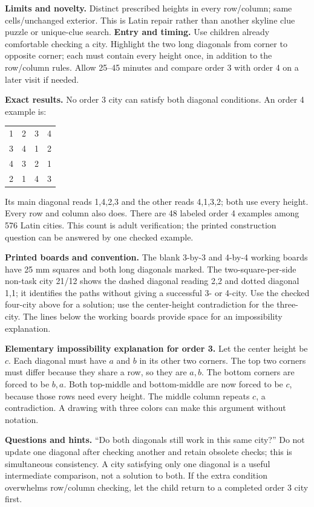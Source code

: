 \textbf{Limits and novelty.} Distinct prescribed heights in every row/column; same cells/unchanged exterior. This is Latin repair rather than another skyline clue puzzle or unique-clue search.
\newpage
{}
\textbf{Entry and timing.} Use children already comfortable checking a city. Highlight the two long diagonals from corner to opposite corner; each must contain every height once, in addition to the row/column rules. Allow 25--45 minutes and compare order 3 with order 4 on a later visit if needed.

\textbf{Exact results.} No order 3 city can satisfy both diagonal conditions. An order 4 example is:

\begin{center}\begin{tabular}{cccc}
1&2&3&4\\3&4&1&2\\4&3&2&1\\2&1&4&3
\end{tabular}\end{center}

Its main diagonal reads 1,4,2,3 and the other reads 4,1,3,2; both use every height. Every row and column also does. There are 48 labeled order 4 examples among 576 Latin cities. This count is adult verification; the printed construction question can be answered by one checked example.

\textbf{Printed boards and convention.} The blank 3-by-3 and 4-by-4 working boards have 25 mm squares and both long diagonals marked. The two-square-per-side non-task city 21/12 shows the dashed diagonal reading 2,2 and dotted diagonal 1,1; it identifies the paths without giving a successful 3- or 4-city. Use the checked four-city above for a solution; use the center-height contradiction for the three-city. The lines below the working boards provide space for an impossibility explanation.

\textbf{Elementary impossibility explanation for order 3.} Let the center height be $c $. Each diagonal must have $a $ and $b $ in its other two corners. The top two corners must differ because they share a row, so they are $a,b $. The bottom corners are forced to be $b,a $. Both top-middle and bottom-middle are now forced to be $c $, because those rows need every height. The middle column repeats $c $, a contradiction. A drawing with three colors can make this argument without notation.

\textbf{Questions and hints.} ``Do both diagonals still work in this same city?'' Do not update one diagonal after checking another and retain obsolete checks; this is simultaneous consistency. A city satisfying only one diagonal is a useful intermediate comparison, not a solution to both. If the extra condition overwhelms row/column checking, let the child return to a completed order 3 city first.

